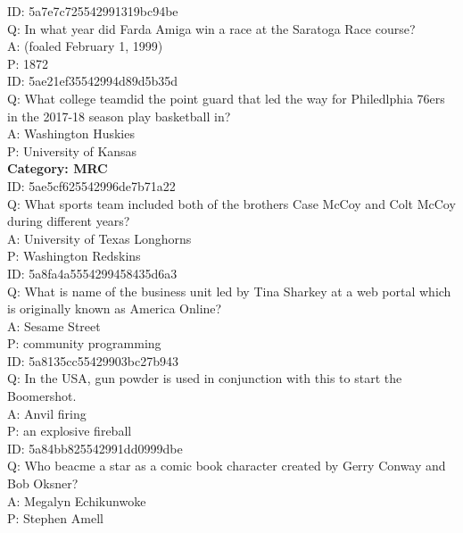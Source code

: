 \documentclass[11pt,a4paper]{article}
\begin{document}
\noindent ID: 5a7e7c725542991319bc94be \\
\noindent Q: In what year did Farda Amiga win a race at the Saratoga Race course? \\
\noindent A: (foaled February 1, 1999) \\
\noindent P: 1872 \\

\noindent ID: 5ae21ef35542994d89d5b35d \\
\noindent Q: What college teamdid the point guard that led the way for Philedlphia 76ers in the 2017-18 season play basketball in? \\
\noindent A: Washington Huskies \\
\noindent P: University of Kansas \\

\noindent \textbf{Category: MRC} \\
\noindent ID: 5ae5cf625542996de7b71a22 \\
\noindent Q: What sports team included both of the brothers Case McCoy and Colt McCoy during different years? \\
\noindent A: University of Texas Longhorns \\
\noindent P: Washington Redskins \\

\noindent ID: 5a8fa4a5554299458435d6a3 \\
\noindent Q: What is name of the business unit led by Tina Sharkey at a web portal which is originally known as America Online? \\
\noindent A: Sesame Street \\
\noindent P: community programming \\

\noindent ID: 5a8135cc55429903bc27b943 \\
\noindent Q: In the USA, gun powder is used in conjunction with this to start the Boomershot. \\
\noindent A: Anvil firing \\
\noindent P: an explosive fireball \\

\noindent ID: 5a84bb825542991dd0999dbe \\
\noindent Q: Who beacme a star as a comic book character created by Gerry Conway and Bob Oksner? \\
\noindent A: Megalyn Echikunwoke \\
\noindent P: Stephen Amell \\
\end{document}
